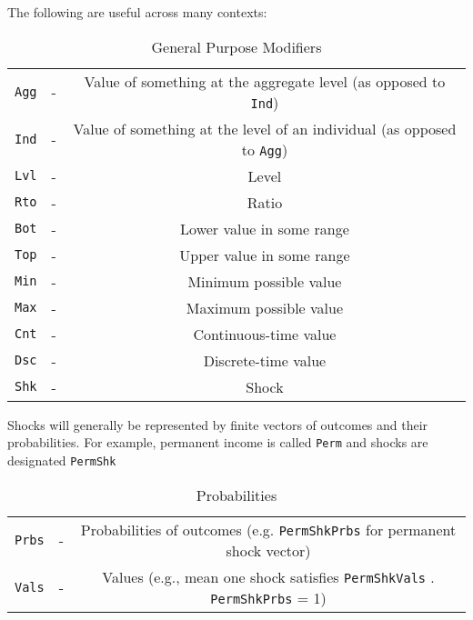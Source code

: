 
The following are useful across many contexts:
\begin{table}[h]
	\centering
	\begin{tabular}{||>{\ttfamily}ccc||}
		\hline
   \texttt{Agg} & - & Value of something at the aggregate level (as opposed to \texttt{Ind})
\\ \texttt{Ind} & - & Value of something at the level of an individual (as opposed to \texttt{Agg})
\\ \texttt{Lvl} & - & Level
\\ \texttt{Rto} & - & Ratio
\\ \texttt{Bot} & - & Lower value in some range
\\ \texttt{Top} & - & Upper value in some range
\\ \texttt{Min} & - & Minimum possible value
\\ \texttt{Max} & - & Maximum possible value
\\ \texttt{Cnt} & - & Continuous-time value
\\ \texttt{Dsc} & - & Discrete-time value
\\ \texttt{Shk} & - & Shock
\\ 	\hline
	\end{tabular}
	\caption{General Purpose Modifiers}
	\label{table:General}
\end{table}

Shocks will generally be represented by finite vectors of outcomes and their probabilities.  For example, permanent income is called \texttt{Perm} and shocks are designated \texttt{PermShk}
\begin{table}[h]
	\centering
	\begin{tabular}{||>{\ttfamily}ccc||}
		\hline
\texttt{Prbs} & - & Probabilities of outcomes (e.g. \texttt{PermShkPrbs} for permanent shock vector)
\\ \texttt{Vals} & - & Values (e.g., mean one shock satisfies \texttt{PermShkVals} . \texttt{PermShkPrbs} = 1)
\\ 	\hline
	\end{tabular}
	\caption{Probabilities}
	\label{table:Probabilities}
\end{table}



